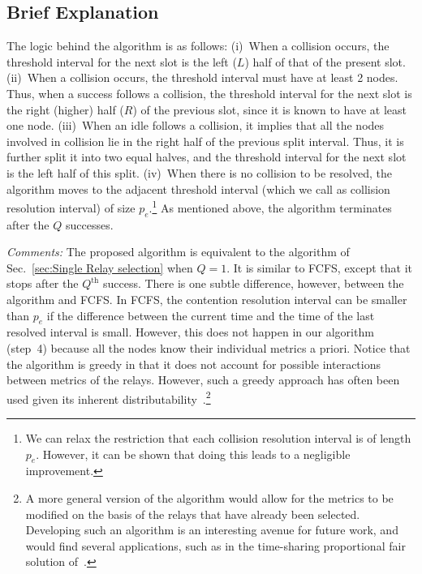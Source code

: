 \documentclass[12pt,draftcls,peerreview, onecolumn]{IEEEtran}
\newcommand{\kth}{^{{\mathrm{th}}}}
\begin{document}
\subsection{Brief Explanation}

The logic behind the algorithm is as follows: (i)~When a collision
occurs, the threshold interval for the next slot is the left ($L$)
half of that of the present slot. (ii)~When a collision occurs, the
threshold interval must have at least 2 nodes. Thus, when a success
follows a collision, the threshold interval for the next slot is the
right (higher) half ($R$) of the previous slot, since it is known to
have at least one node.  (iii)~When an idle follows a collision, it
implies that all the nodes involved in collision lie in the right half
of the previous split interval. Thus, it is further split it into two
equal halves, and the threshold interval for the next slot is the left
half of this split.  (iv)~When there is no collision to be resolved,
the algorithm moves to the adjacent threshold interval (which we call
as collision resolution interval) of size $p_e$.\footnote{We can relax
  the restriction that each collision resolution interval is of length
  $p_e$. However, it can be shown that doing this leads to a
  negligible improvement.} As mentioned above, the algorithm
terminates after the $Q$ successes.

{\em Comments:} The proposed algorithm is equivalent to the algorithm
of Sec.~\ref{sec:Single Relay selection} when $Q=1$. It is similar to
FCFS, except that it stops after the $Q\kth$ success. There is one
subtle difference, however, between the algorithm and FCFS. In FCFS,
the contention resolution interval can be smaller than $p_e$ if the
difference between the current time and the time of the last resolved
interval is small.  However, this does not happen in our algorithm
(step~4) because all the nodes know their individual metrics a priori.
Notice that the algorithm is greedy in that it does not account for
possible interactions between metrics of the relays.  However, such a
greedy approach has often been used given its inherent
distributability~\cite{ding_TWC_2009}.\footnote{A more general version
  of the algorithm would allow for the metrics to be modified on the
  basis of the relays that have already been selected.  Developing
  such an algorithm is an interesting avenue for future work, and
  would find several applications, such as in the time-sharing
  proportional fair solution of~\cite{oechtering_TWC_2008}.}
\end{document}
